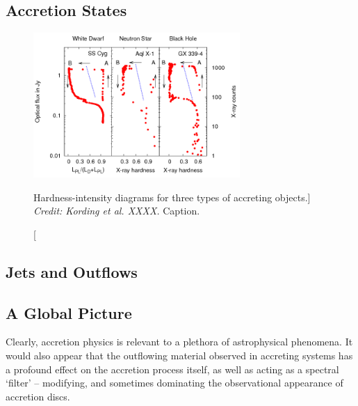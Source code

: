 \subsection{Accretion States}


\begin{figure}
\centering
\includegraphics[width=0.7\textwidth]{figures/01-intro/kording_hid.png}
\caption
[Hardness-intensity diagrams for three types of accreting objects.]
{
{\sl Credit: Kording et al. XXXX.} 
Caption.
} 
\label{fig:kording_hid}
\end{figure}



\subsection{Jets and Outflows}


\subsection{A Global Picture}

Clearly, accretion physics is relevant to a plethora of astrophysical phenomena. 
It would also appear that the outflowing material observed in accreting systems 
has a profound effect on the accretion process itself, as well as acting 
as a spectral `filter' -- modifying, and sometimes dominating the observational 
appearance of accretion discs.

